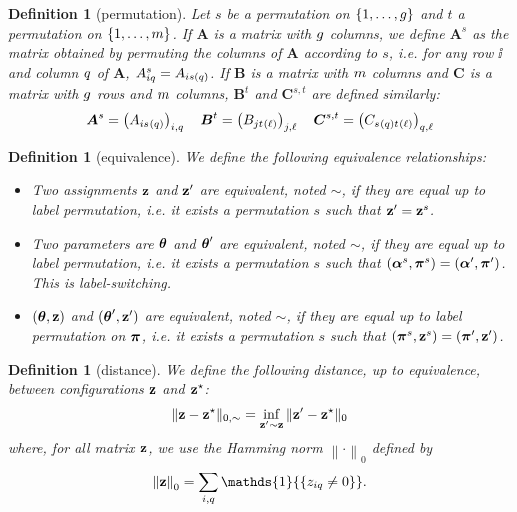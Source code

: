 \documentclass[]{imsart}
\newcommand{\1}{\mathds{1}}
\numberwithin{equation}{section}
\theoremstyle{plain}
\newtheorem{dof}[thm]{Definition}
\theoremstyle{remark}
\begin{document}
\begin{dof}[permutation]
  \label{def:permutation}
  Let $s$ be a permutation on $\{1,\dots,g\}$ and $t$ a permutation on $\{1,\dots,m\}$. If $\boldsymbol{A}$ is a matrix with $g$ columns, we define $\boldsymbol{A}^s$ as the matrix obtained by permuting the columns of $\boldsymbol{A}$ according to $s$, \emph{i.e.} for any row $\ii$ and column $q$ of $\boldsymbol{A}$, ${A}^s_{i q} = A_{i s(q)}$. If $\boldsymbol{B}$ is a matrix with $m$ columns and $\boldsymbol{C}$ is a matrix with $g$ rows and $m$ columns, $\boldsymbol{B}^t$ and $\boldsymbol{C}^{s,t}$ are defined similarly:
  \begin{equation*}
    \boldsymbol{A}^s = \left( A_{\ii s^{}(\kk)} \right)_{\ii,\kk} \quad  \boldsymbol{B}^t = \left( B_{\jj t^{}(\el)} \right)_{\jj, \el} \quad \boldsymbol{C}^{s,t} = \left( C_{s^{}(\kk) t^{}(\el)} \right)_{\kk,\el}
  \end{equation*}
\end{dof}

\begin{dof}[equivalence]
  \label{def:equivalence}
  We define the following equivalence relationships:
  \begin{itemize}
  \item Two assignments $\mathbf{z}$ and $\mathbf{z}'$ are \emph{equivalent}, noted $\sim$, if they are equal up to label permutation, \emph{i.e.} it exists a permutation $s$ such that $\mathbf{z}' = \mathbf{z}^s$.
  \item Two parameters are $\boldsymbol{\theta}$ and $\boldsymbol{\theta}'$ are \emph{equivalent}, noted $\sim$, if they are equal up to label permutation, \emph{i.e.} it exists a permutation $s$ such that $(\boldsymbol{\alpha}^s,\boldsymbol{\pi}^{s}) = (\boldsymbol{\alpha}', \boldsymbol{\pi}')$. This is \emph{label-switching}.
  \item  $(\boldsymbol{\theta}, \mathbf{z})$ and $(\boldsymbol{\theta}', \mathbf{z}')$ are \emph{equivalent}, noted $\sim$, if they are equal up to label permutation on $\boldsymbol{\pi}$, \emph{i.e.} it exists a permutation $s$ such that $(\boldsymbol{\pi}^{s}, \mathbf{z}^s) = (\boldsymbol{\pi}', \mathbf{z}')$.
  \end{itemize}
\end{dof}

\begin{dof}[distance]
  \label{def:equivalence-distance}
  We define the following distance, up to equivalence, between configurations $\mathbf{z}$ and $\mathbf{z}^\star$:
    \begin{equation*}
    \|\bz - \bzs\|_{0, \sim} = \inf_{\bz' \sim \bz} \|\bz' - \bzs\|_0
    \end{equation*}
    where, for all matrix $\mathbf{z}$, we use the Hamming norm $\left\|\cdot\right\|_{0}$ defined by
\[\left\|\bz\right\|_{0}=\sum_{\ii,\kk}{\mathds{1}{\left\{\zik\neq0\right\}}}.\]
\end{dof}
  
\end{document}
